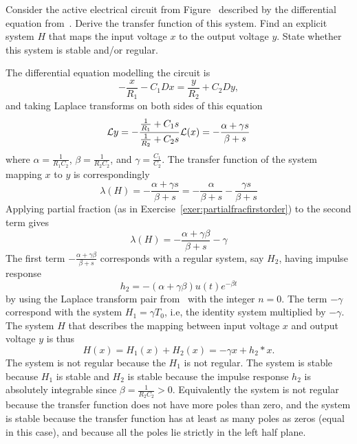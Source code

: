\begin{excersizelist}
\item Consider the active electrical circuit from Figure~ described by the differential equation from~.  Derive the transfer function of this system.  Find an explicit system $H$ that maps the input voltage $x$ to the output voltage $y$.  State whether this system is stable and/or regular.
\begin{solution}
The differential equation modelling the circuit is
\[
-\frac{x}{R_1} - C_1 D x = \frac{y}{R_2} + C_2 D y,
\]
and taking Laplace transforms on both sides of this equation
\[
\mathcal L{y} = -\frac{\tfrac{1}{R_1} + C_1s}{\tfrac{1}{R_2} + C_2s} \mathcal L(x) = -\frac{\alpha + \gamma s}{\beta + s}
\]
where $\alpha = \tfrac{1}{R_1C_2}$, $\beta = \tfrac{1}{R_2C_2}$, and $\gamma = \tfrac{C_1}{C_2}$.  The transfer function of the system mapping $x$ to $y$ is correspondingly
\[
\lambda(H) = -\frac{\alpha + \gamma s}{\beta + s} = -\frac{\alpha}{\beta + s} - \frac{\gamma s}{\beta + s}
\]
Applying partial fraction (as in Exercise~\ref{exer:partialfracfirstorder}) to the second term gives
\[
\lambda(H) = -\frac{\alpha + \gamma\beta}{\beta + s} - \gamma
\]
The first term $-\frac{\alpha + \gamma\beta}{\beta + s}$ corresponds with a regular system, say $H_2$, having impulse response
\[
h_2 = -(\alpha + \gamma\beta) u(t) e^{-\beta t}
\]
by using the Laplace transform pair from~ with the integer $n=0$.  The term $-\gamma$ correspond with the system $H_1 = \gamma T_0$, i.e, the identity system multiplied by $-\gamma$.  The system $H$ that describes the mapping between input voltage $x$ and output voltage $y$ is thus
\[
H(x) = H_1(x) + H_2(x) = -\gamma x + h_2 * x.
\]
The system is not regular because the $H_1$ is not regular.  The system is stable because $H_1$ is stable and $H_2$ is stable because the impulse response $h_2$ is absolutely integrable since $\beta = \tfrac{1}{R_2C_2} > 0$.  Equivalently the system is not regular because the transfer function does not have more poles than zero, and the system is stable because the transfer function has at least as many poles as zeros (equal in this case), and because all the poles lie strictly in the left half plane. 
\end{solution}


\end{excersizelist}
